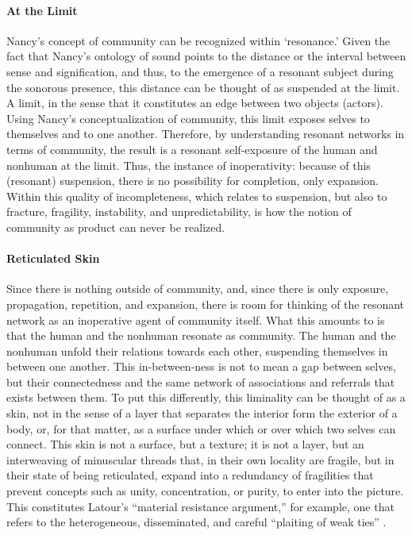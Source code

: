 \paragraph{At the Limit}
Nancy's concept of community can be recognized within `resonance.' Given the fact that Nancy's ontology of sound points to the distance or the interval between sense and signification, and thus, to the emergence of a resonant subject during the sonorous presence, this distance can be thought of as suspended at the limit. A limit, in the sense that it constitutes an edge between two objects (actors). Using Nancy's conceptualization of community, this limit exposes selves to themselves and to one another. Therefore, by understanding resonant networks in terms of community, the result is a resonant self-exposure of the human and nonhuman at the limit. Thus, the instance of inoperativity: because of this (resonant) suspension, there is no possibility for completion, only expansion. Within this quality of incompleteness, which relates to suspension, but also to fracture, fragility, instability, and unpredictability, is how the notion of community as product can never be realized.

\paragraph{Reticulated Skin}
Since there is nothing outside of community, and, since there is only exposure, propagation, repetition, and expansion, there is room for thinking of the resonant network as an inoperative agent of community itself. What this amounts to is that the human and the nonhuman resonate as community. The human and the nonhuman unfold their relations towards each other, suspending themselves in between one another. This in-between-ness is not to mean a gap between selves, but their connectedness and the same network of associations and referrals that exists between them. To put this differently, this liminality can be thought of as a skin, not in the sense of a layer that separates the interior form the exterior of a body, or, for that matter, as a surface under which or over which two selves can connect. This skin is not a surface, but a texture; it is not a layer, but an interweaving of minuscular threads that, in their own locality are fragile, but in their state of being reticulated, expand into a redundancy of fragilities that prevent concepts such as unity, concentration, or purity, to enter into the picture. This constitutes Latour's ``material resistance argument,'' for example, one that refers to the heterogeneous, disseminated, and careful ``plaiting of weak ties'' \parencite[3]{Lat90:On}.

